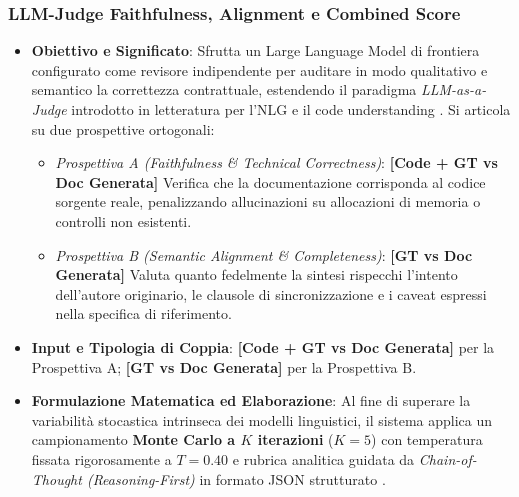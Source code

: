 \subsubsection{LLM-Judge Faithfulness, Alignment e Combined Score}
\label{subsubsec:llm_judge}
\begin{itemize}[leftmargin=*, label=\textbullet]
    \item \textbf{Obiettivo e Significato}: Sfrutta un Large Language Model di frontiera configurato come revisore indipendente per auditare in modo qualitativo e semantico la correttezza contrattuale, estendendo il paradigma \emph{LLM-as-a-Judge} introdotto in letteratura per l'NLG e il code understanding \cite{liu_g-eval_2023,zhu_judgelm_2025,bai_mt-bench-101_2024,wu_can_2024}. Si articola su due prospettive ortogonali:
    \begin{itemize}
        \item \emph{Prospettiva A (Faithfulness \& Technical Correctness)}: \textbf{[Code + GT vs Doc Generata]} Verifica che la documentazione corrisponda al codice sorgente reale, penalizzando allucinazioni su allocazioni di memoria o controlli non esistenti.
        \item \emph{Prospettiva B (Semantic Alignment \& Completeness)}: \textbf{[GT vs Doc Generata]} Valuta quanto fedelmente la sintesi rispecchi l'intento dell'autore originario, le clausole di sincronizzazione e i caveat espressi nella specifica di riferimento.
    \end{itemize}
    \item \textbf{Input e Tipologia di Coppia}: \textbf{[Code + GT vs Doc Generata]} per la Prospettiva A; \textbf{[GT vs Doc Generata]} per la Prospettiva B.
    \item \textbf{Formulazione Matematica ed Elaborazione}: Al fine di superare la variabilità stocastica intrinseca dei modelli linguistici, il sistema applica un campionamento \textbf{Monte Carlo a $K$ iterazioni} ($K=5$) con temperatura fissata rigorosamente a $T = 0.40$ e rubrica analitica guidata da \emph{Chain-of-Thought (Reasoning-First)} in formato JSON strutturato \cite{wu_can_2024}.
    

\end{itemize}
